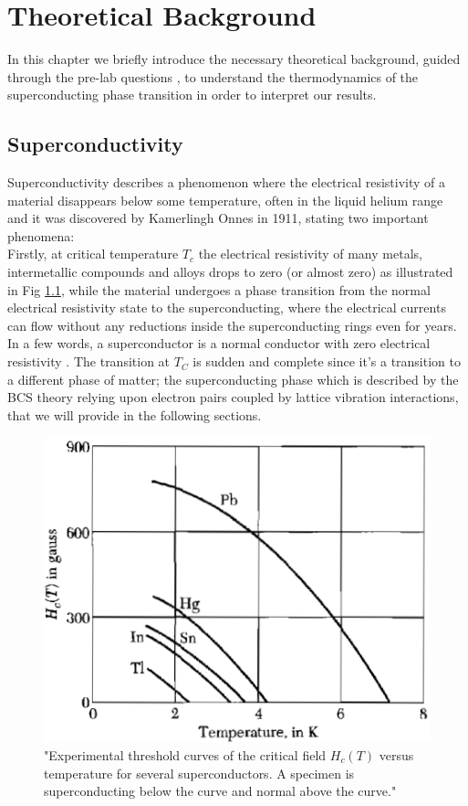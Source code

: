 \documentclass[openany,11pt,a4paper]{report}
\begin{document}
\chapter{Theoretical Background}

In this chapter we briefly introduce the necessary theoretical background, guided through the pre-lab questions \cite{script}, to understand the thermodynamics of the superconducting phase transition in order to interpret
our results. 






\section{Superconductivity}
Superconductivity describes a phenomenon where the
electrical resistivity of a material disappears
below some temperature, often in the liquid helium range and it was discovered by  Kamerlingh Onnes in 1911, stating two important phenomena:\\
Firstly, at critical temperature $T_{c}$ the electrical resistivity of many metals, intermetallic compounds and alloys drops to zero (or almost zero) as illustrated in Fig \ref{Fig:temp}, while the material undergoes a phase transition from the normal electrical resistivity state to the superconducting, where the electrical currents can flow without any reductions inside the superconducting rings even for years. In a few words, a superconductor is a normal conductor with zero electrical resistivity \cite{kittel}. The transition at $T_{C}$ is sudden and complete since it's a transition to a different phase of matter; the superconducting phase which is described by the BCS theory relying upon electron pairs coupled by lattice vibration interactions, that we will provide in the following sections. \cite{1}



\begin{figure}[H]
\centering
\includegraphics[scale=0.6]{Tcmaterials.PNG}
\caption{"Experimental threshold
curves of the critical field $H_{c}(T)$
versus temperature for several superconductors.
A specimen is superconducting
below the curve and
normal above the curve." \cite{kittel}}
\label{Fig:temp}
\end{figure}
\end{document}
